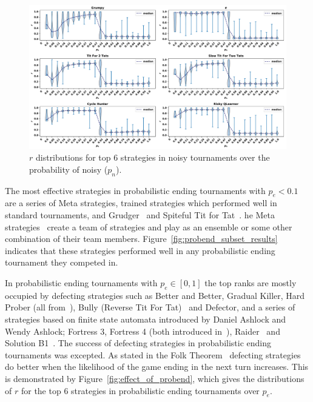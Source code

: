 \documentclass{article}
\begin{document}
\begin{figure}[!htbp]
    \centering
    \includegraphics[width=.92\textwidth]{../images/noise_effect.pdf}
    \caption{\(r\) distributions for top 6 strategies in noisy tournaments over
    the probability of noisy ($p_n$).}
    \label{fig:effect_of_noise}
\end{figure}

The most effective strategies in probabilistic ending tournaments with \(p_e
< 0.1\) are a series of Meta strategies, trained strategies which performed well
in standard tournaments, and  Grudger~\cite{axelrodproject} and Spiteful Tit for
Tat~\cite{prison}. he Meta strategies~\cite{axelrodproject} create a team of
strategies and play as an ensemble or some other combination of their team
members. Figure~\ref{fig:probend_subset_results} indicates that these strategies
performed well in any probabilistic ending tournament they competed in.

In probabilistic ending tournaments with \(p_e \in [0, 1]\) the top ranks are
mostly occupied by defecting strategies such as Better and Better, Gradual
Killer, Hard Prober (all from~\cite{axelrodproject}), Bully (Reverse Tit For
Tat)~\cite{Nachbar1992} and Defector, and a series of strategies based on finite
state automata introduced by Daniel Ashlock and Wendy Ashlock; Fortress 3,
Fortress 4 (both introduced in~\cite{Ashlock2006}), Raider~\cite{Ashlock2014}
and Solution B1~\cite{Ashlock2014}. The success of defecting strategies in
probabilistic ending tournaments was excepted. As stated in the Folk
Theorem~\cite{Fudenberg2009} defecting strategies do better when the likelihood
of the game ending in the next turn increases.
This is demonstrated by Figure~\ref{fig:effect_of_probend}, which gives the
distributions of \(r\) for the top 6 strategies in probabilistic ending tournaments
over \(p_e\).
\end{document}
